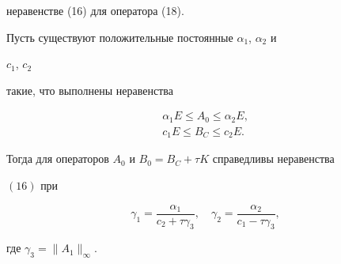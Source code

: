неравенстве (16) для оператора (18). 


 


\begin{lem} 


Пусть существуют положительные постоянные $\alpha_1$, $\alpha_2$ и 


$c_1$, $c_2$ 


такие, что выполнены неравенства 


\begin{gather} 


\alpha_1E\le A_0\le\alpha_2E,\\ 


c_1E\le B_C\le c_2E. 


\end{gather} 


Тогда для операторов $A_0$ и $B_0=B_C+\tau K$ справедливы неравенства 


$(16)$ при 


\begin{equation} 


\gamma_1=\frac{\alpha_1}{c_2+\tau\gamma_3},\quad 


\gamma_2=\frac{\alpha_2}{c_1-\tau\gamma_3}, 


\end{equation} 


где $\gamma_3=\|A_1\|_\infty$. 


\end{lem} 


 


